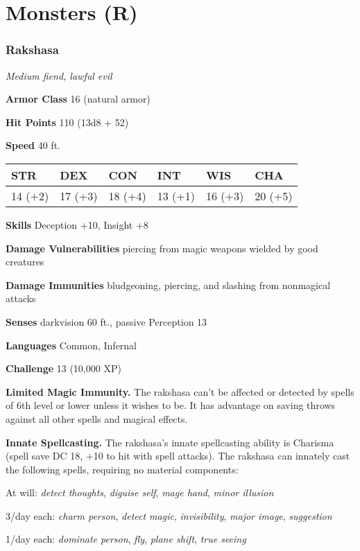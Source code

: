 \documentclass[
]{article}
\date{}
\begin{document}
\hypertarget{monsters-r}{%
\section{Monsters (R)}\label{monsters-r}}

\hypertarget{rakshasa}{%
\subsubsection{Rakshasa}\label{rakshasa}}

\emph{Medium fiend, lawful evil}

\textbf{Armor Class} 16 (natural armor)

\textbf{Hit Points} 110 (13d8 + 52)

\textbf{Speed} 40 ft.

\begin{longtable}[]{@{}llllll@{}}
\toprule
STR & DEX & CON & INT & WIS & CHA\tabularnewline
\midrule
\endhead
14 (+2) & 17 (+3) & 18 (+4) & 13 (+1) & 16 (+3) & 20 (+5)\tabularnewline
\bottomrule
\end{longtable}

\textbf{Skills} Deception +10, Insight +8

\textbf{Damage Vulnerabilities} piercing from magic weapons wielded by
good creatures

\textbf{Damage Immunities} bludgeoning, piercing, and slashing from
nonmagical attacks

\textbf{Senses} darkvision 60 ft., passive Perception 13

\textbf{Languages} Common, Infernal

\textbf{Challenge} 13 (10,000 XP)

\textbf{Limited Magic Immunity.} The rakshasa can't be affected or
detected by spells of 6th level or lower unless it wishes to be. It has
advantage on saving throws against all other spells and magical effects.

\textbf{Innate Spellcasting.} The rakshasa's innate spellcasting ability
is Charisma (spell save DC 18, +10 to hit with spell attacks). The
rakshasa can innately cast the following spells, requiring no material
components:

At will: \emph{detect thoughts}, \emph{diguise self}, \emph{mage hand},
\emph{minor illusion}

3/day each: \emph{charm person}, \emph{detect magic},
\emph{invisibility}, \emph{major image}, \emph{suggestion}

1/day each: \emph{dominate person}, \emph{fly}, \emph{plane shift},
\emph{true seeing}
\end{document}
